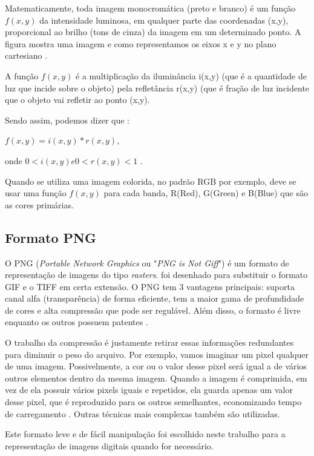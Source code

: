 Matematicamente, toda imagem monocromática (preto e branco) é um função $f(x,y)$ da intensidade luminosa, em qualquer parte das coordenadas (x,y), proporcional ao brilho (tons de cinza) da imagem em um determinado ponto. A figura mostra uma imagem e como representamos os eixos x e y no plano cartesiano \cite{gonzalez_woods}. 

A função  $f(x,y)$  é a multiplicação da iluminância  i(x,y) (que é a quantidade de luz que incide sobre o objeto) pela refletância  r(x,y)  (que é fração de luz incidente que o objeto vai refletir ao ponto (x,y). 

Sendo assim, podemos dizer que :

$f(x,y) = i(x,y) * r(x,y)$,

onde $0 < i(x,y) e 0 < r(x,y) < 1$ .

Quando se utiliza uma imagem colorida, no padrão RGB por exemplo,  deve se usar uma função $f(x,y)$ para cada banda, R(Red), G(Green) e B(Blue) que são as cores primárias\cite{gonzalez_woods}.

 
\subsection{Formato PNG}\label{subsec:png}

O PNG (\textit{Portable Network Graphics} ou "\textit{PNG is Not Giff}") é um formato de representação de imagens do tipo \textit{rasters}. foi desenhado para substituir o formato GIF e o TIFF em certa extensão. O PNG tem 3 vantagens principais: suporta canal alfa (transparência) de forma eficiente, tem a maior gama de profundidade de cores e alta compressão que pode ser regulável. Além disso, o formato é livre enquanto os outros possuem patentes \cite{png}. 

O trabalho da compressão é justamente retirar essas informações redundantes para diminuir o peso do arquivo. Por exemplo, vamos imaginar um pixel qualquer de uma imagem. Possivelmente, a cor ou o valor desse pixel será igual a de vários outros elementos dentro da mesma imagem. Quando a imagem é comprimida, em vez de ela possuir vários pixels iguais e repetidos, ela guarda apenas um valor desse pixel, que é reproduzido para os outros semelhantes, economizando tempo de carregamento \cite{img_compact}. Outras técnicas mais complexas também são utilizadas.

Este formato leve e de fácil manipulação foi escolhido neste trabalho para a representação de imagens digitais quando for necessário.

